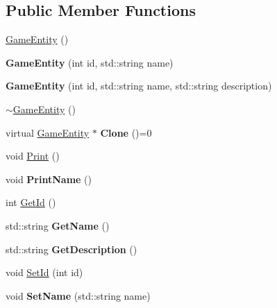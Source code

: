 \subsection*{Public Member Functions}
\begin{DoxyCompactItemize}
\item 
\hyperlink{class_game_entity_a43e4841110c2de7e207d25cd31573616}{Game\+Entity} ()
\item 
\hypertarget{class_game_entity_ac534073fe3e7b25d95029c8af622a88e}{}{\bfseries Game\+Entity} (int id, std\+::string name)\label{class_game_entity_ac534073fe3e7b25d95029c8af622a88e}

\item 
\hypertarget{class_game_entity_a941b5c3c653f7526545bd81816e9531a}{}{\bfseries Game\+Entity} (int id, std\+::string name, std\+::string description)\label{class_game_entity_a941b5c3c653f7526545bd81816e9531a}

\item 
\hyperlink{class_game_entity_a241238b29b5e440107a5b295edf24f9c}{$\sim$\+Game\+Entity} ()
\item 
\hypertarget{class_game_entity_a0effae7533a6e242c71a5ccd2bb5a030}{}virtual \hyperlink{class_game_entity}{Game\+Entity} $\ast$ {\bfseries Clone} ()=0\label{class_game_entity_a0effae7533a6e242c71a5ccd2bb5a030}

\item 
void \hyperlink{class_game_entity_ac909a518389ee9bc92562b4166340766}{Print} ()
\item 
\hypertarget{class_game_entity_aab71ff714f47988b091fc40f2c30195a}{}void {\bfseries Print\+Name} ()\label{class_game_entity_aab71ff714f47988b091fc40f2c30195a}

\item 
int \hyperlink{class_game_entity_ad20b660a4f851e9636fdfd15f0d44df0}{Get\+Id} ()
\item 
\hypertarget{class_game_entity_ae45ee64de484dec1b16aea85171d9856}{}std\+::string {\bfseries Get\+Name} ()\label{class_game_entity_ae45ee64de484dec1b16aea85171d9856}

\item 
\hypertarget{class_game_entity_ac8da446a6c6990585b6581fe8537b7bf}{}std\+::string {\bfseries Get\+Description} ()\label{class_game_entity_ac8da446a6c6990585b6581fe8537b7bf}

\item 
void \hyperlink{class_game_entity_a5846ca63544cea04c672d51361e82537}{Set\+Id} (int id)
\item 
\hypertarget{class_game_entity_aa48a3a64bc80d6e199301b9d5bac4409}{}void {\bfseries Set\+Name} (std\+::string name)\label{class_game_entity_aa48a3a64bc80d6e199301b9d5bac4409}


\end{DoxyCompactItemize}
